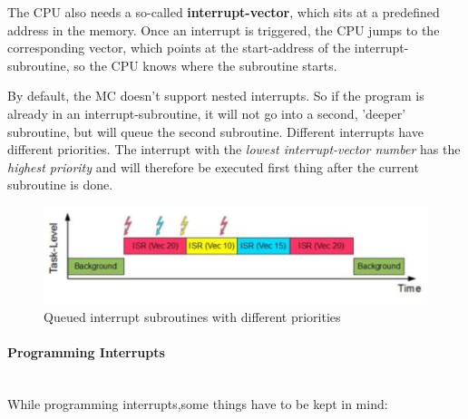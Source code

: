 \documentclass[a4paper, 11pt, nofootinbib]{book}
\begin{document}
\vspace{10px}

\noindent The CPU also needs a so-called \textbf{interrupt-vector}, which sits at a predefined address in the memory. Once an interrupt is triggered, the CPU jumps to the corresponding vector, which points at the start-address of the interrupt-subroutine, so the CPU knows where the subroutine starts.
\vspace{10px}

\noindent By default, the MC doesn't support nested interrupts. So if the program is already in an interrupt-subroutine, it will not go into a second, 'deeper' subroutine, but will queue the second subroutine. Different interrupts have different priorities. The interrupt with the \textit{lowest interrupt-vector number} has the \textit{highest priority} and will therefore be executed first thing after the current subroutine is done.

\begin{figure}[htb]
	\centering
	\includegraphics[keepaspectratio=true,height=7\baselineskip]{interrupt_priority.jpg}
	\caption{Queued interrupt subroutines with different priorities}
	\label{fig:interrupt_prio}
\end{figure}

\restoregeometry

\paragraph{Programming Interrupts}\mbox{}\\
While programming interrupts,some things have to be kept in mind:
\end{document}
